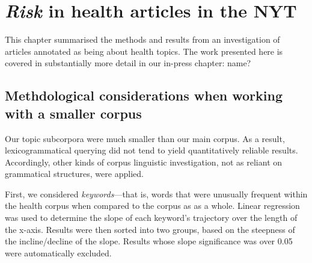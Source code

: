 \chapter{\emph{Risk} in health articles in the NYT}

    This chapter summarised the methods and results from an investigation of articles annotated as being about health topics. The work presented here is covered  in substantially more detail in our in-press chapter:  name?

    \section{Methdological considerations when working with a smaller corpus}

    Our topic subcorpora were much smaller than our main corpus. As a result, lexicogrammatical querying did not tend to yield quantitatively reliable results. Accordingly, other kinds of corpus linguistic investigation, not as reliant on grammatical structures, were applied. 

    First, we considered \emph{keywords}---that is, words that were unusually frequent within the health corpus when compared to the corpus as as a whole. Linear regression was used to determine the slope of each keyword's trajectory over the length of the x-axis. Results were then sorted into two groups, based on the steepness of the incline\slash decline of the slope. Results whose slope significance was over 0.05 were automatically excluded.

